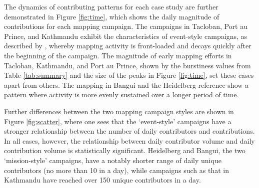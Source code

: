 The dynamics of contributing patterns for each case study are further demonstrated in Figure \ref{fig:time}, which shows the daily magnitude of contributions for each mapping campaign. The campaigns in Tacloban, Port au Prince, and Kathmandu exhibit the characteristics of event-style campaigns, as described by \textcite{dittus_mass_2017}, whereby mapping activity is front-loaded and decays quickly after the beginning of the campaign. The magnitude of early mapping efforts in Tacloban, Kathmandu, and Port au Prince, shown by the burstiness values from Table \ref{tab:summary} and the size of the peaks in Figure \ref{fig:time}, set these cases apart from others. The mapping in Bangui and the Heidelberg reference show a pattern where activity is more evenly sustained over a longer period of time. 

Further differences between the two mapping campaign styles are shown in Figure \ref{fig:scatter}, where one sees that the ‘event-style’ campaigns have a stronger relationship between the number of daily contributors and contributions.  In all cases, however, the relationship between daily contributor volume and daily contribution volume is statistically significant. Heidelberg and Bangui, the two ‘mission-style’ campaigns, have a notably shorter range of daily unique contributors (no more than 10 in a day), while campaigns such as that in Kathmandu have reached over 150 unique contributors in a day. 

